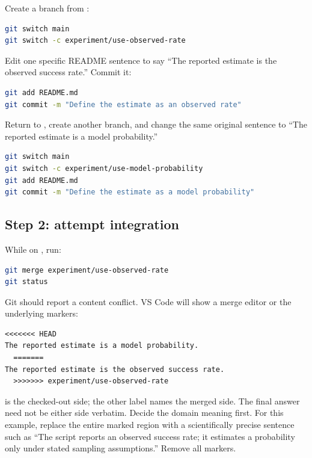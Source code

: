 Create a branch from :

\begin{lstlisting}[language=bash,numbers=none]
git switch main
git switch -c experiment/use-observed-rate
\end{lstlisting}

Edit one specific README sentence to say ``The reported estimate is the observed
success rate.'' Commit it:

\begin{lstlisting}[language=bash,numbers=none]
git add README.md
git commit -m "Define the estimate as an observed rate"
\end{lstlisting}

Return to , create another branch, and change the same original
sentence to ``The reported estimate is a model probability.''

\begin{lstlisting}[language=bash,numbers=none]
git switch main
git switch -c experiment/use-model-probability
git add README.md
git commit -m "Define the estimate as a model probability"
\end{lstlisting}

\subsection*{Step 2: attempt integration}

While on , run:

\begin{lstlisting}[language=bash,numbers=none]
git merge experiment/use-observed-rate
git status
\end{lstlisting}

Git should report a content conflict. VS Code will show a merge editor or the
underlying markers:

\begin{lstlisting}[numbers=none]
  <<<<<<< HEAD
The reported estimate is a model probability.
  =======
The reported estimate is the observed success rate.
  >>>>>>> experiment/use-observed-rate
\end{lstlisting}

 is the checked-out side; the other label names the merged side. The
final answer need not be either side verbatim. Decide the domain meaning first.
For this example, replace the entire marked region with a scientifically precise
sentence such as ``The script reports an observed success rate; it estimates a
probability only under stated sampling assumptions.'' Remove all markers.

